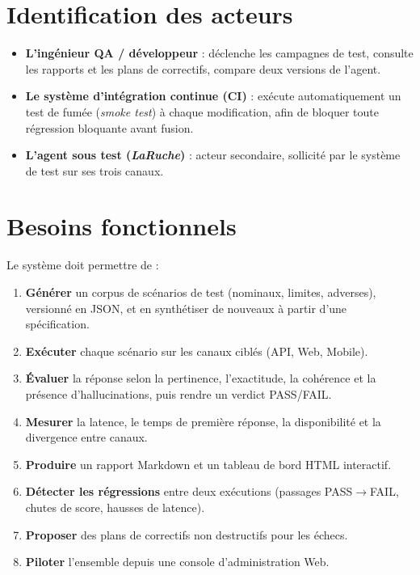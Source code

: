 \documentclass[12pt,a4paper,oneside]{report}
\newcommand{\sut}{\textit{LaRuche}}
\begin{document}
\section{Identification des acteurs}
\begin{itemize}[leftmargin=*]
  \item \textbf{L'ingénieur QA / développeur} : déclenche les campagnes de test,
  consulte les rapports et les plans de correctifs, compare deux versions de l'agent.
  \item \textbf{Le système d'intégration continue (CI)} : exécute automatiquement un
  test de fumée (\textit{smoke test}) à chaque modification, afin de bloquer toute
  régression bloquante avant fusion.
  \item \textbf{L'agent sous test (\sut{})} : acteur secondaire, sollicité par le
  système de test sur ses trois canaux.
\end{itemize}

\section{Besoins fonctionnels}
Le système doit permettre de :
\begin{enumerate}[leftmargin=*]
  \item \textbf{Générer} un corpus de scénarios de test (nominaux, limites, adverses),
  versionné en JSON, et en synthétiser de nouveaux à partir d'une spécification.
  \item \textbf{Exécuter} chaque scénario sur les canaux ciblés (API, Web, Mobile).
  \item \textbf{Évaluer} la réponse selon la pertinence, l'exactitude, la cohérence et
  la présence d'hallucinations, puis rendre un verdict PASS/FAIL.
  \item \textbf{Mesurer} la latence, le temps de première réponse, la disponibilité et
  la divergence entre canaux.
  \item \textbf{Produire} un rapport Markdown et un tableau de bord HTML interactif.
  \item \textbf{Détecter les régressions} entre deux exécutions (passages PASS$\to$FAIL,
  chutes de score, hausses de latence).
  \item \textbf{Proposer} des plans de correctifs non destructifs pour les échecs.
  \item \textbf{Piloter} l'ensemble depuis une console d'administration Web.
\end{enumerate}
\end{document}
